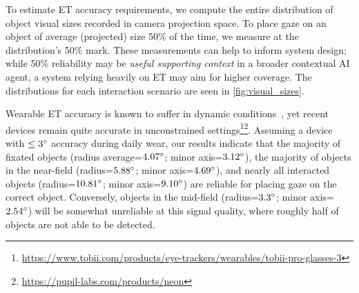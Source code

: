 To estimate ET accuracy requirements, we compute the entire distribution of object visual sizes recorded in camera projection space. To place gaze on an object of average (projected) size 50\% of the time, we measure at the distribution's 50\% mark.  These measurements can help to inform system design; while 50\% reliability may be \textit{useful supporting context} in a broader contextual AI agent, a system relying heavily on ET may aim for higher coverage.  The distributions for each interaction scenario are seen in \autoref{fig:visual_sizes}.

Wearable ET accuracy is known to suffer in dynamic conditions~\cite{onkhar_tobii_2023}, yet recent devices remain quite accurate in unconstrained settings\footnote{\url{https://www.tobii.com/products/eye-trackers/wearables/tobii-pro-glasses-3}}\footnote{\url{https://pupil-labs.com/products/neon}}.  Assuming a device with $\leq 3 \degree$ accuracy during daily wear, our results indicate that the majority of fixated objects (radius average=$4.07\degree$; minor axis=$3.12\degree$), the majority of objects in the near-field (radius=$5.88\degree$; minor axis=$4.69\degree$), and nearly all interacted objects (radius=$10.81\degree$; minor axis=$9.10\degree$) are reliable for placing gaze on the correct object.  Conversely, objects in the mid-field (radius=$3.3\degree$; minor axis=$2.54\degree$) will be somewhat unreliable at this signal quality, where roughly half of objects are not able to be detected.
